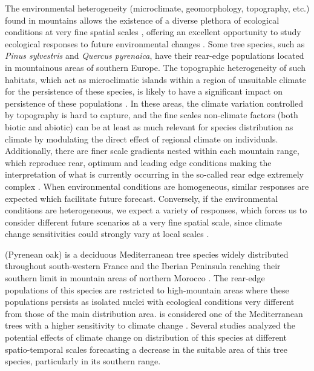 The environmental heterogeneity (microclimate, geomorphology, topography, etc.) found in mountains allows the existence of a diverse plethora of ecological conditions at very fine spatial scales \autocite{Hannahetal2014FinegrainModeling,KornerSpehn2019HumboldtianView}, offering an excellent opportunity to study ecological responses to future environmental changes \autocite{SpehnKorner2009MountainLaboratory,Kohleretal2014MountainsClimate,Payneetal2017OpportunitiesResearch,Zamoraetal2017GlobalChange}. Some tree species, such as \emph{Pinus sylvestris} and \emph{Quercus pyrenaica}, have their rear-edge populations located in mountainous areas of southern Europe. The topographic heterogeneity of such habitats, which act as microclimatic islands within a region of unsuitable climate for the persistence of these species, is likely to have a significant impact on persistence of these populations \autocite{MeineriHylander2017FinegrainLargedomain}. In these areas, the climate variation controlled by topography \autocite{Franklinetal2013ModelingPlant,Potteretal2013MicroclimaticChallenges} is hard to capture, and the fine scales non-climate factors (both biotic and abiotic) can be at least as much relevant for species distribution as climate \autocite{Loetal2010WordCaution} by modulating the direct effect of regional climate on individuals. Additionally, there are finer scale gradients nested within each mountain range, which reproduce rear, optimum and leading edge conditions making the interpretation of what is currently occurring in the so-called rear edge extremely complex \autocite{Benavidesetal2013DirectIndirect,Oldfatheretal2020RangeEdges}. When environmental conditions are homogeneous, similar responses are expected which facilitate future forecast. Conversely, if the environmental conditions are heterogeneous, we expect a variety of responses, which forces us to consider different future scenarios at a very fine spatial scale, since climate change sensitivities could strongly vary at local scales \autocite{Lindneretal2010ClimateChange,GeaIzquierdoCanellas2014LocalClimate,Titoetal2020MountainEcosystems}.

\Qpw (Pyrenean oak) is a deciduous Mediterranean tree species widely distributed throughout south-western France and the Iberian Peninsula reaching their southern limit in mountain areas of northern Morocco \autocite{Franco1990Quercus}. The rear-edge populations of this species are restricted to high-mountain areas where these populations persists as isolated nuclei with ecological conditions very different from those of the main distribution area. \Qp is considered one of the Mediterranean trees with a higher sensitivity to climate change \autocite{BenitoGarzonetal2008EffectsClimate,GarciaValdesetal2013ChasingMoving}. Several studies analyzed the potential effects of climate change on distribution of this species at different spatio-temporal scales \autocite{Benitoetal2011SimulatingPotential,BenitoGarzonetal2008EffectsClimate,BenitoGarzonetal2007PredictiveModelling,Felicisimo2011ImpactosVulnerabilidad,GeaIzquierdoetal2013GrowthProjections,RuizBenitoetal2013PatternsDrivers,RuizLabourdetteetal2013ChangesTree,Urbietaetal2011MediterraneanPine} forecasting a decrease in the suitable area of this tree species, particularly in its southern range.

